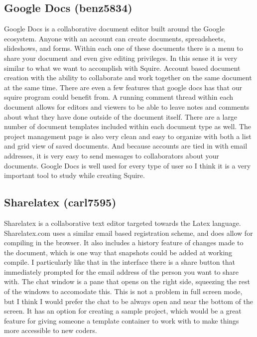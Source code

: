 \documentclass[11pt]{report}
\begin{document}
\subsection{Google Docs (benz5834)}
Google Docs is a collaborative document editor built around the Google ecosystem. Anyone with an account can create documents, spreadsheets, slideshows, and forms. Within each one of these documents there is a menu to share your document and even give editing privileges. In this sense it is very similar to what we want to accomplish with Squire. Account based document creation with the ability to collaborate and work together on the same document at the same time. There are even a few features that google docs has that our squire program could benefit from. A running comment thread within each document allows for editors and viewers to be able to leave notes and comments about what they have done outside of the document itself. There are a large number of document templates included within each document type as well. The project management page is also very clean and easy to organize with both a list and grid view of saved documents. And because accounts are tied in with email addresses, it is very easy to send messages to collaborators about your documents. Google Docs is well used for every type of user so I think it is a very important tool to study while creating Squire.

\subsection{Sharelatex (carl7595)}
Sharelatex is a collaborative text editor targeted towards the Latex language. Sharelatex.com uses a similar email based registration scheme, and does allow for compiling in the browser. It also includes a history feature of changes made to the document, which is one way that snapshots could be added at working compile. I particularly like that in the interface there is a share button that immediately prompted for the email address of the person you want to share with. The chat window is a pane that opens on the right side, squeezing the rest of the windows to accomodate this. This is not a problem in full screen mode, but I think I would prefer the chat to be always open and near the bottom of the screen. It has an option for creating a sample project, which would be a great feature for giving someone a template container to work with to make things more accessible to new coders. 
\end{document}
